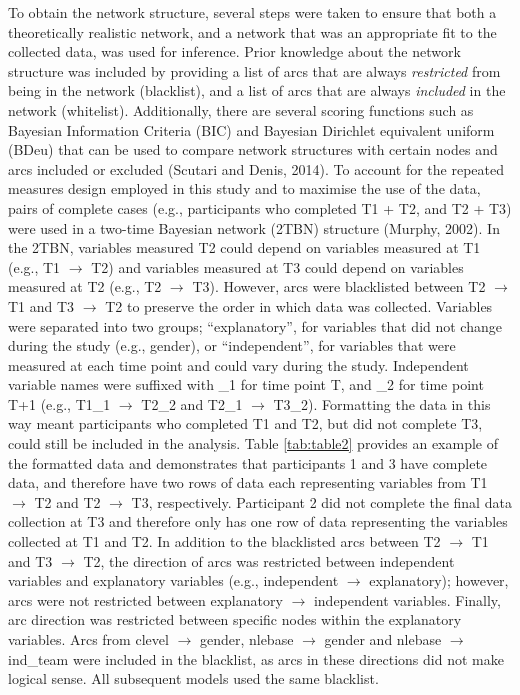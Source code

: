 \documentclass[
]{frontiersHLTH}
\begin{document}
To obtain the network structure, several steps were taken to ensure that
both a theoretically realistic network, and a network that was an
appropriate fit to the collected data, was used for inference. Prior
knowledge about the network structure was included by providing a list
of arcs that are always \emph{restricted} from being in the network
(blacklist), and a list of arcs that are always \emph{included} in the
network (whitelist). Additionally, there are several scoring functions
such as Bayesian Information Criteria (BIC) and Bayesian Dirichlet
equivalent uniform (BDeu) that can be used to compare network structures
with certain nodes and arcs included or excluded (Scutari and Denis,
2014). To account for the repeated measures design employed in this
study and to maximise the use of the data, pairs of complete cases
(e.g., participants who completed T1 + T2, and T2 + T3) were used in a
two-time Bayesian network (2TBN) structure (Murphy, 2002). In the 2TBN,
variables measured T2 could depend on variables measured at T1 (e.g., T1
\(\rightarrow\) T2) and variables measured at T3 could depend on
variables measured at T2 (e.g., T2 \(\rightarrow\) T3). However, arcs
were blacklisted between T2 \(\rightarrow\) T1 and T3 \(\rightarrow\) T2
to preserve the order in which data was collected. Variables were
separated into two groups; ``explanatory'', for variables that did not
change during the study (e.g., gender), or ``independent'', for
variables that were measured at each time point and could vary during
the study. Independent variable names were suffixed with \_1 for time
point T, and \_2 for time point T+1 (e.g., T1\_1 \(\rightarrow\) T2\_2
and T2\_1 \(\rightarrow\) T3\_2). Formatting the data in this way meant
participants who completed T1 and T2, but did not complete T3, could
still be included in the analysis. Table \ref{tab:table2} provides an
example of the formatted data and demonstrates that participants 1 and 3
have complete data, and therefore have two rows of data each
representing variables from T1 \(\rightarrow\) T2 and T2 \(\rightarrow\)
T3, respectively. Participant 2 did not complete the final data
collection at T3 and therefore only has one row of data representing the
variables collected at T1 and T2. In addition to the blacklisted arcs
between T2 \(\rightarrow\) T1 and T3 \(\rightarrow\) T2, the direction
of arcs was restricted between independent variables and explanatory
variables (e.g., independent \(\rightarrow\) explanatory); however, arcs
were not restricted between explanatory \(\rightarrow\) independent
variables. Finally, arc direction was restricted between specific nodes
within the explanatory variables. Arcs from clevel \(\rightarrow\)
gender, nlebase \(\rightarrow\) gender and nlebase \(\rightarrow\)
ind\_team were included in the blacklist, as arcs in these directions
did not make logical sense. All subsequent models used the same
blacklist.
\end{document}
